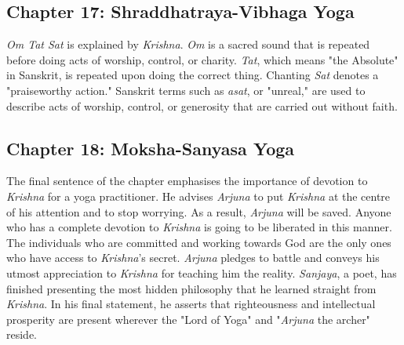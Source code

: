 \documentclass[runningheads]{llncs}
\begin{document}
\subsection{Chapter 17: Shraddhatraya-Vibhaga Yoga}
\textit{Om Tat Sat} is explained by \textit{Krishna}. \textit{Om} is a sacred sound that is repeated before doing acts of worship, control, or charity. \textit{Tat}, which means "the Absolute" in Sanskrit, is repeated upon doing the correct thing. Chanting \textit{Sat} denotes a "praiseworthy action." Sanskrit terms such as \textit{asat}, or "unreal," are used to describe acts of worship, control, or generosity that are carried out without faith.
\subsection{Chapter 18: Moksha-Sanyasa Yoga}
The final sentence of the chapter emphasises the importance of devotion to \textit{Krishna} for a yoga practitioner. He advises \textit{Arjuna} to put \textit{Krishna} at the centre of his attention and to stop worrying. As a result, \textit{Arjuna} will be saved. Anyone who has a complete devotion to \textit{Krishna} is going to be liberated in this manner. The individuals who are committed and working towards God are the only ones who have access to \textit{Krishna}'s secret. \textit{Arjuna} pledges to battle and conveys his utmost appreciation to \textit{Krishna} for teaching him the reality. \textit{Sanjaya}, a poet, has finished presenting the most hidden philosophy that he learned straight from \textit{Krishna}. In his final statement, he asserts that righteousness and intellectual prosperity are present wherever the "Lord of Yoga" and "\textit{Arjuna }the archer" reside.
\end{document}
